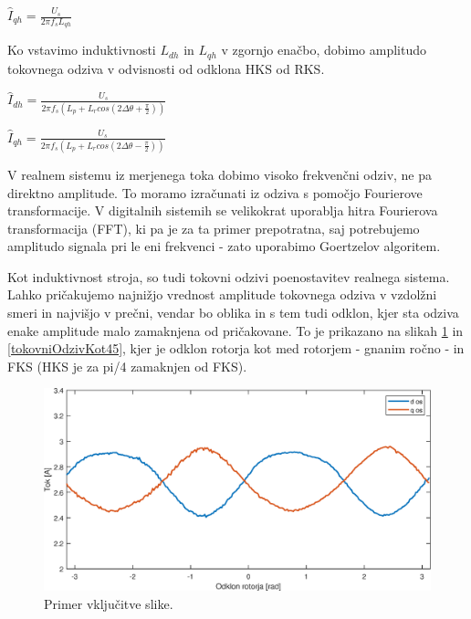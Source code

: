 \documentclass[a4paper,twoside,openright,12pt,slovene]{book}
\begin{document}
\begin{center}
    $\hat{I}_{qh} = \frac{U_s}{2\pi f_sL_{qh}}$
\end{center}

Ko vstavimo induktivnosti $L_{dh}$ in $L_{qh}$ v zgornjo enačbo, dobimo amplitudo tokovnega odziva v odvisnosti od odklona HKS od RKS.
\begin{center}
    $\hat{I}_{dh} = \frac{U_s}{2\pi f_s (L_p + L_r cos(2\Delta\theta + \frac{\pi}{2}))}$
\end{center}

\begin{center}
    $\hat{I}_{qh} = \frac{U_s}{2\pi f_s (L_p + L_r cos(2\Delta\theta - \frac{\pi}{2}))}$
\end{center}

V realnem sistemu iz merjenega toka dobimo visoko frekvenčni odziv, ne pa direktno amplitude. To moramo izračunati iz odziva s pomočjo Fourierove transformacije. V digitalnih sistemih se velikokrat
uporablja hitra Fourierova transformacija (FFT), ki pa je za ta primer prepotratna, saj potrebujemo amplitudo signala pri le eni frekvenci - zato uporabimo Goertzelov algoritem.

Kot induktivnost stroja, so tudi tokovni odzivi poenostavitev realnega sistema. Lahko pričakujemo najnižjo vrednost amplitude tokovnega odziva v vzdolžni smeri in najvišjo v prečni, vendar bo oblika
in s tem tudi odklon, kjer sta odziva enake amplitude malo zamaknjena od pričakovane. To je prikazano na slikah \ref{tokovniOdzivKot0} in \ref{tokovniOdzivKot45}, kjer je odklon rotorja kot med
rotorjem - gnanim ročno - in FKS (HKS je za pi/4 zamaknjen od FKS).

\begin{figure}[!htbp]
    \centering
    \includegraphics[width=1\columnwidth]{Slike/tokovniOdzivKot0.eps}
    \caption{\label{tokovniOdzivKot0} Primer vključitve slike.}
\end{figure}
\end{document}
